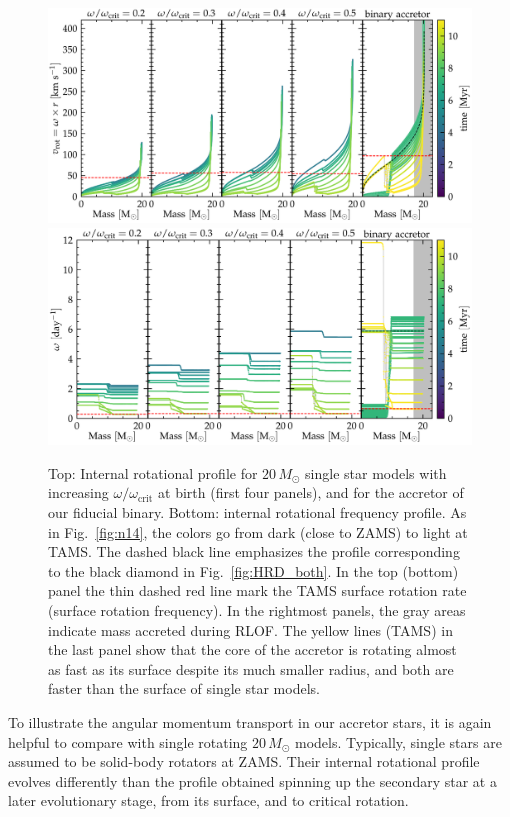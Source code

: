 \documentclass[twocolumn,twocolappendix,trackchanges]{aastex63}
\DeclareRobustCommand{\Figref}[1]{Fig.~\ref{#1}}
\begin{document}
\begin{figure}[tbp]
  \centering
  \includegraphics[width=\textwidth]{zeta_Rotational_struct}
  \includegraphics[width=\textwidth]{omega_struct}
  \caption{Top: Internal rotational profile for $20\,M_\odot$ single
    star models with increasing $\omega/\omega_\mathrm{crit}$ at birth
    (first four panels), and for the accretor of our fiducial
    binary. Bottom: internal rotational frequency profile. As in
    \Figref{fig:n14}, the colors go from dark (close to ZAMS) to light
    at TAMS. The dashed black line emphasizes the profile
    corresponding to the black diamond in \Figref{fig:HRD_both}. In
    the top (bottom) panel the thin dashed red line mark the TAMS surface
    rotation rate (surface rotation frequency). In the rightmost panels, the gray areas indicate
    mass accreted during RLOF. The yellow lines (TAMS) in the last
    panel show that the core of the accretor is rotating almost as
    fast as its surface despite its much smaller radius, and both are
    faster than the surface of single star models.}
  \label{fig:struct_rot}
\end{figure}

To illustrate the angular momentum transport in our accretor stars, it
is again helpful to compare with single rotating $20\,M_\odot$
models. Typically, single stars are assumed to be solid-body rotators
at ZAMS. Their internal rotational profile evolves differently than
the profile obtained spinning up the secondary star at a later
evolutionary stage, from its surface, and to critical rotation.
\end{document}
